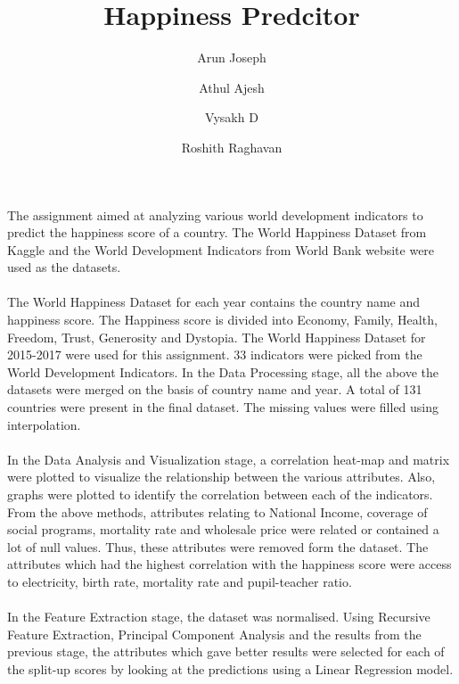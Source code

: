 \documentclass[twocolumn]{article}
\begin{document}
\title{\textbf{Happiness Predcitor}}

\author{Arun Joseph \and Athul Ajesh \and Vysakh D \and Roshith Raghavan}

\twocolumn[
	\begin{@twocolumnfalse}
	\maketitle
    \vspace{0.5cm}
    \end{@twocolumnfalse}
]

The assignment aimed at analyzing various world development indicators to predict the happiness score of a country. The World Happiness Dataset from Kaggle and the World Development Indicators from World Bank website were used as the datasets.

\paragraph{}
The World Happiness Dataset for each year contains the country name and happiness score. The Happiness score is divided into Economy, Family, Health, Freedom, Trust, Generosity and Dystopia. The World Happiness Dataset for 2015-2017 were used for this assignment. 33 indicators were picked from the World Development Indicators. In the Data Processing stage, all the above the datasets were merged on the basis of country name and year. A total of 131 countries were present in the final dataset. The missing values were filled using interpolation.

\paragraph{}
In the Data Analysis and Visualization stage, a correlation heat-map and matrix were plotted to visualize the relationship between the various attributes. Also, graphs were plotted to identify the correlation between each of the indicators. From the above methods, attributes relating to National Income, coverage of social programs, mortality rate and wholesale price were related or contained a lot of null values. Thus, these attributes were removed form the dataset. The attributes which had the highest correlation with the happiness score were access to electricity, birth rate, mortality rate and pupil-teacher ratio.

\paragraph{}
In the Feature Extraction stage, the dataset was normalised. Using Recursive Feature Extraction, Principal Component Analysis and the results from the previous stage, the attributes which gave better results were selected for each of the split-up scores by looking at the predictions using a Linear Regression model.
\end{document}
